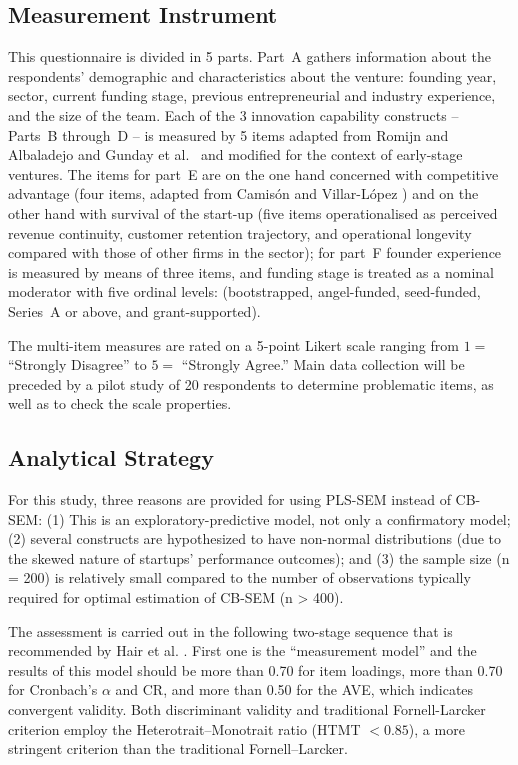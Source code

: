 \documentclass{ieeeaccess}
\begin{document}
\subsection{Measurement Instrument}

This questionnaire is divided in 5 parts. Part~A gathers information about the respondents' demographic and characteristics about the venture: founding year, sector, current funding stage, previous entrepreneurial and industry experience, and the size of the team. Each of the 3 innovation capability constructs – Parts~B through~D – is measured by 5 items adapted from Romijn and Albaladejo \cite{b6} and Gunday et al.\ \cite{b3} and modified for the context of early-stage ventures. The items for part~E are on the one hand concerned with competitive advantage (four items, adapted from Camisón and Villar-López \cite{b18}) and on the other hand with survival of the start-up (five items operationalised as perceived revenue continuity, customer retention trajectory, and operational longevity compared with those of other firms in the sector); for part~F founder experience is measured by means of three items, and funding stage is treated as a nominal moderator with five ordinal levels: (bootstrapped, angel-funded, seed-funded, Series~A or above, and grant-supported).

The multi-item measures are rated on a 5-point Likert scale ranging from $1=$ ``Strongly Disagree'' to $5=$ ``Strongly Agree.'' Main data collection will be preceded by a pilot study of 20 respondents to determine problematic items, as well as to check the scale properties.

\subsection{Analytical Strategy}

For this study, three reasons are provided for using PLS-SEM instead of CB-SEM: (1) This is an exploratory-predictive model, not only a confirmatory model; (2) several constructs are hypothesized to have non-normal distributions (due to the skewed nature of startups' performance outcomes); and (3) the sample size (n = 200) is relatively small compared to the number of observations typically required for optimal estimation of CB-SEM (n > 400).

The assessment is carried out in the following two-stage sequence that is recommended by Hair et al. \cite{b22}. First one is the “measurement model” and the results of this model should be more than 0.70 for item loadings, more than 0.70 for Cronbach's $\alpha$ and CR, and more than 0.50 for the AVE, which indicates convergent validity. Both discriminant validity and traditional Fornell-Larcker criterion employ the Heterotrait--Monotrait ratio (HTMT $< 0.85$), a more stringent criterion than the traditional Fornell–Larcker.
\end{document}

